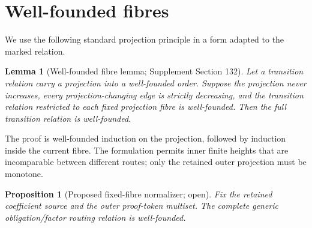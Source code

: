 \documentclass[11pt]{article}
\newtheorem{lemma}[theorem]{Lemma}
\newtheorem{proposition}[theorem]{Proposition}
\begin{document}
\section{Well-founded fibres}

We use the following standard projection principle in a form adapted to the
marked relation.

\begin{lemma}[Well-founded fibre lemma; Supplement Section 132]
Let a transition relation carry a projection into a well-founded order.
Suppose the projection never increases, every projection-changing edge is
strictly decreasing, and the transition relation restricted to each fixed
projection fibre is well-founded. Then the full transition relation is
well-founded.
\end{lemma}

The proof is well-founded induction on the projection, followed by induction
inside the current fibre. The formulation permits inner finite heights that
are incomparable between different routes; only the retained outer projection
must be monotone.

\begin{proposition}[Proposed fixed-fibre normalizer; open]
Fix the retained coefficient source and the outer proof-token multiset. The
complete generic obligation/factor routing relation is well-founded.
\end{proposition}
\end{document}
